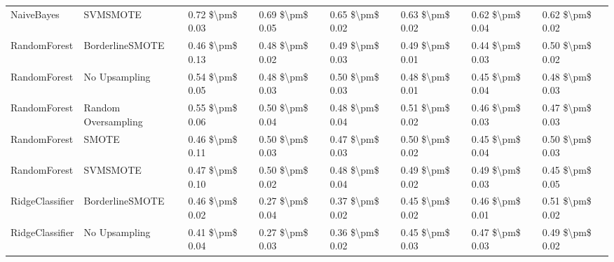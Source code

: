 \begin{tabular}{llllllll}
                     NaiveBayes &                      SVMSMOTE & 0.72 \$\textbackslash pm\$ 0.03 &           0.69 \$\textbackslash pm\$ 0.05 &       0.65 \$\textbackslash pm\$ 0.02 &        0.63 \$\textbackslash pm\$ 0.02 &                         0.62 \$\textbackslash pm\$ 0.04 & 0.62 \$\textbackslash pm\$ 0.02 \\
                   RandomForest &               BorderlineSMOTE & 0.46 \$\textbackslash pm\$ 0.13 &           0.48 \$\textbackslash pm\$ 0.02 &       0.49 \$\textbackslash pm\$ 0.03 &        0.49 \$\textbackslash pm\$ 0.01 &                         0.44 \$\textbackslash pm\$ 0.03 & 0.50 \$\textbackslash pm\$ 0.02 \\
                   RandomForest &                 No Upsampling & 0.54 \$\textbackslash pm\$ 0.05 &           0.48 \$\textbackslash pm\$ 0.03 &       0.50 \$\textbackslash pm\$ 0.03 &        0.48 \$\textbackslash pm\$ 0.01 &                         0.45 \$\textbackslash pm\$ 0.04 & 0.48 \$\textbackslash pm\$ 0.03 \\
                   RandomForest &           Random Oversampling & 0.55 \$\textbackslash pm\$ 0.06 &           0.50 \$\textbackslash pm\$ 0.04 &       0.48 \$\textbackslash pm\$ 0.04 &        0.51 \$\textbackslash pm\$ 0.02 &                         0.46 \$\textbackslash pm\$ 0.03 & 0.47 \$\textbackslash pm\$ 0.03 \\
                   RandomForest &                         SMOTE & 0.46 \$\textbackslash pm\$ 0.11 &           0.50 \$\textbackslash pm\$ 0.03 &       0.47 \$\textbackslash pm\$ 0.03 &        0.50 \$\textbackslash pm\$ 0.02 &                         0.45 \$\textbackslash pm\$ 0.04 & 0.50 \$\textbackslash pm\$ 0.03 \\
                   RandomForest &                      SVMSMOTE & 0.47 \$\textbackslash pm\$ 0.10 &           0.50 \$\textbackslash pm\$ 0.02 &       0.48 \$\textbackslash pm\$ 0.04 &        0.49 \$\textbackslash pm\$ 0.02 &                         0.49 \$\textbackslash pm\$ 0.03 & 0.45 \$\textbackslash pm\$ 0.05 \\
                RidgeClassifier &               BorderlineSMOTE & 0.46 \$\textbackslash pm\$ 0.02 &           0.27 \$\textbackslash pm\$ 0.04 &       0.37 \$\textbackslash pm\$ 0.02 &        0.45 \$\textbackslash pm\$ 0.02 &                         0.46 \$\textbackslash pm\$ 0.01 & 0.51 \$\textbackslash pm\$ 0.02 \\
                RidgeClassifier &                 No Upsampling & 0.41 \$\textbackslash pm\$ 0.04 &           0.27 \$\textbackslash pm\$ 0.03 &       0.36 \$\textbackslash pm\$ 0.02 &        0.45 \$\textbackslash pm\$ 0.03 &                         0.47 \$\textbackslash pm\$ 0.03 & 0.49 \$\textbackslash pm\$ 0.02 \\

\end{tabular}
